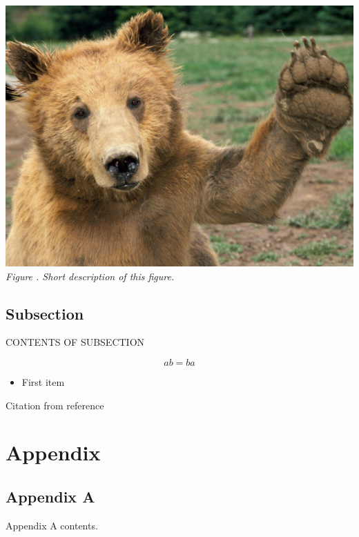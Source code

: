 \documentclass[11pt]{article}
\newcounter{cter}
\newcommand{\ccounter}{
	\thecter.
	\stepcounter{cter}
}
\begin{document}
		\begin{center}	%
			\includegraphics[scale=0.1]{example_pic}\\ %
			\textit{Figure\ccounter Short description of this figure.}
		\end{center}
		
	\subsection{Subsection}
	
	CONTENTS OF SUBSECTION
	
	\begin{equation}
		ab = ba	%
	\end{equation}
	
	\begin{itemize}
		\item First item %
	\end{itemize}
	
	Citation from reference \autocite{glad-06}
		
	\pagebreak
		
	\setcounter{secnumdepth}{0} %
	
	\printbibliography %
	
	\pagebreak
	
	\section{Appendix}
	\subsection{Appendix A} %
	
	Appendix A contents.
\end{document}
